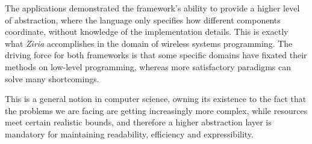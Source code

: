 \documentclass[sigplan,review,anonymous]{acmart}
\begin{document}
The applications demonstrated the framework's ability to provide a higher level
of abstraction, where the language only specifies how different components
coordinate, without knowledge of the implementation details. This is exactly
what \textit{Ziria} accomplishes in the domain of wireless systems
programming\cite{ziria}. The driving force for both frameworks is that some
specific domains have fixated their methods on low-level programming, whereas
more satisfactory paradigms can solve many shortcomings.

This is a general notion in computer science, owning its existence to the fact
that the problems we are facing are getting increasingly more complex, while
resources meet certain realistic bounds, and therefore a higher abstraction
layer is mandatory for maintaining readability, efficiency and expressibility.



\end{document}
